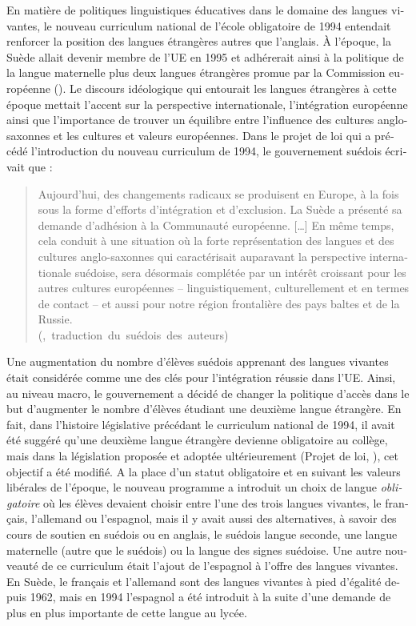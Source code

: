 \documentclass[french, output=paper]{langscibook}
\begin{document}
\begin{otherlanguage}{french}
En matière de politiques linguistiques éducatives dans le domaine des langues vivantes, le nouveau curriculum national de l'école obligatoire de 1994 entendait renforcer la position des langues étrangères autres que l’anglais. À l'époque, la Suède allait devenir membre de l'UE en 1995 et adhérerait ainsi à la politique de la langue maternelle plus deux langues étrangères promue par la Commission européenne (\citealt{EuropeanCommission1995}). Le discours idéologique qui entourait les langues étrangères à cette époque mettait l’accent sur la perspective internationale, l’intégration européenne ainsi que l’importance de trouver un équilibre entre l’influence des cultures anglo-saxonnes et les cultures et valeurs européennes. Dans le projet de loi qui a précédé l’introduction du nouveau curriculum de 1994, le gouvernement suédois écrivait que : 

\begin{quote}
Aujourd'hui, des changements radicaux se produisent en Europe, à la fois sous la forme d'efforts d'intégration et d’exclusion. La Suède a présenté sa demande d'adhésion à la Communauté européenne. […] En même temps, cela conduit à une situation où la forte représentation des langues et des cultures anglo-saxonnes qui caractérisait auparavant la perspective internationale suédoise, sera désormais complétée par un intérêt croissant pour les autres cultures européennes -- linguistiquement, culturellement et en termes de contact -- et aussi pour notre région frontalière des pays baltes et de la Russie.\\
\hbox{}\hfill\hbox{(\citeauthor{Prop1992/93}, traduction du suédois des auteurs)}
\end{quote}

Une augmentation du nombre d’élèves suédois apprenant des langues vivantes était considérée comme une des clés pour l’intégration réussie dans l’UE. Ainsi, au niveau macro, le gouvernement a décidé de changer la politique d’accès dans le but d’augmenter le nombre d’élèves étudiant une deuxième langue étrangère. En fait, dans l'histoire législative précédant le curriculum national de 1994, il avait été suggéré qu’une deuxième langue étrangère devienne obligatoire au collège, mais dans la législation proposée et adoptée ultérieurement (Projet de loi, \citeauthor{Prop1992/93}), cet objectif a été modifié. A la place d’un statut obligatoire et en suivant les valeurs libérales de l’époque, le nouveau programme a introduit un choix de langue \textit{obligatoire} où les élèves devaient choisir entre l'une des trois langues vivantes, le français, l’allemand ou l’espagnol, mais il y avait aussi des alternatives, à savoir des cours de soutien en suédois ou en anglais, le suédois langue seconde, une langue maternelle (autre que le suédois) ou la langue des signes suédoise. Une autre nouveauté de ce curriculum était l’ajout de l’espagnol à l’offre des langues vivantes. En Suède, le français et l’allemand sont des langues vivantes à pied d’égalité depuis 1962, mais en 1994 l’espagnol a été introduit à la suite d’une demande de plus en plus importante de cette langue au lycée. 


\end{otherlanguage}
\end{document}
